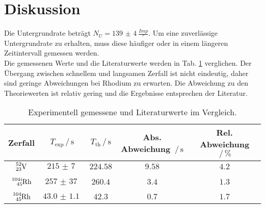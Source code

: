 \section{Diskussion}
\label{sec:Diskussion}
Die Untergrundrate beträgt $N_U = \SI{139(4)}{\frac{Imp}{\second}}$.
Um eine zuverlässige Untergrundrate zu erhalten, muss diese häufiger oder in einem längeren Zeitintervall gemessen werden.
\\
Die gemessenen Werte und die Literaturwerte werden in Tab. \ref{tab:ergebnisse} verglichen.
Der Übergang zwischen schnellem und langsamen Zerfall ist nicht eindeutig, daher sind geringe Abweichungen bei Rhodium zu erwarten.
Die Abweichung zu den Theoriewerten \cite{zerfall} ist relativ gering und die Ergebnisse entsprechen der Literatur.
\begin{table}
    \centering
    \begin{tabular}{c|cccc}
        \toprule
        Zerfall & $T_\text{exp} \,/\, \si{\second}$ & $T_\text{th} \,/\, \si{\second}$ & Abs. Abweichung $\,/\, \si{\second}$ & Rel. Abweichung $\,/\, \si{\percent}$ \\
        \midrule
        $\ce{^{52}_{23}V}$ & $\SI{215(7)}{}$ & $224.58$ & $9.58$ & $4.2$ \\
        &&&&\\
        $\ce{^{104i}_{45}Rh}$ & $\SI{257(37)}{}$ & $260.4$ & $3.4$ & $1.3$ \\
        &&&&\\
        $\ce{^{104}_{45}Rh}$ & $\SI{43.0(11)}{}$ & $42.3$ & $0.7$ & $1.7$ \\
        \bottomrule
    \end{tabular}
    \caption{Experimentell gemessene und Literaturwerte \cite{zerfall} im Vergleich.}
    \label{tab:ergebnisse}
\end{table}

